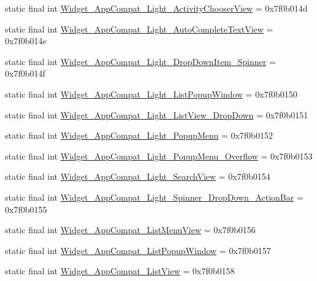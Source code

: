 \begin{CompactItemize}
\item 
static final int \hyperlink{classandroid_1_1support_1_1v7_1_1cardview_1_1_r_1_1style_f7deba0a2f976c5c7ef337e84bdf6839}{Widget\_\-AppCompat\_\-Light\_\-ActivityChooserView} = 0x7f0b014d
\item 
static final int \hyperlink{classandroid_1_1support_1_1v7_1_1cardview_1_1_r_1_1style_18b7d3e46944e60410e02a32c268d965}{Widget\_\-AppCompat\_\-Light\_\-AutoCompleteTextView} = 0x7f0b014e
\item 
static final int \hyperlink{classandroid_1_1support_1_1v7_1_1cardview_1_1_r_1_1style_3737b25c4be10d9829fa8220dd347ace}{Widget\_\-AppCompat\_\-Light\_\-DropDownItem\_\-Spinner} = 0x7f0b014f
\item 
static final int \hyperlink{classandroid_1_1support_1_1v7_1_1cardview_1_1_r_1_1style_b9cc30068f7f19cf8d67fed160276b84}{Widget\_\-AppCompat\_\-Light\_\-ListPopupWindow} = 0x7f0b0150
\item 
static final int \hyperlink{classandroid_1_1support_1_1v7_1_1cardview_1_1_r_1_1style_819708297676e4eaac85536ad936295b}{Widget\_\-AppCompat\_\-Light\_\-ListView\_\-DropDown} = 0x7f0b0151
\item 
static final int \hyperlink{classandroid_1_1support_1_1v7_1_1cardview_1_1_r_1_1style_9d553ac49accb758a74a09945a9c3cd6}{Widget\_\-AppCompat\_\-Light\_\-PopupMenu} = 0x7f0b0152
\item 
static final int \hyperlink{classandroid_1_1support_1_1v7_1_1cardview_1_1_r_1_1style_18a01f33832e92926b46152a8bd6e910}{Widget\_\-AppCompat\_\-Light\_\-PopupMenu\_\-Overflow} = 0x7f0b0153
\item 
static final int \hyperlink{classandroid_1_1support_1_1v7_1_1cardview_1_1_r_1_1style_5994c838a47a3569aa6a85eae640fdef}{Widget\_\-AppCompat\_\-Light\_\-SearchView} = 0x7f0b0154
\item 
static final int \hyperlink{classandroid_1_1support_1_1v7_1_1cardview_1_1_r_1_1style_c2225f6c5b6a94df46bb87d1d9c9241c}{Widget\_\-AppCompat\_\-Light\_\-Spinner\_\-DropDown\_\-ActionBar} = 0x7f0b0155
\item 
static final int \hyperlink{classandroid_1_1support_1_1v7_1_1cardview_1_1_r_1_1style_be906bfa50e3ed768c715a3adecc58c3}{Widget\_\-AppCompat\_\-ListMenuView} = 0x7f0b0156
\item 
static final int \hyperlink{classandroid_1_1support_1_1v7_1_1cardview_1_1_r_1_1style_e50437b39e1f29ccea56198e031cce41}{Widget\_\-AppCompat\_\-ListPopupWindow} = 0x7f0b0157
\item 
static final int \hyperlink{classandroid_1_1support_1_1v7_1_1cardview_1_1_r_1_1style_ddcfdfa1ceeb6c4264fa90829fb4a6b4}{Widget\_\-AppCompat\_\-ListView} = 0x7f0b0158

\end{CompactItemize}
